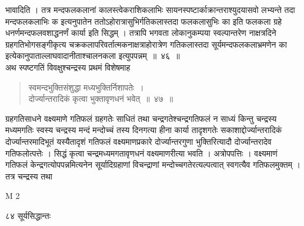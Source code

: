 \documentclass[11pt, openany]{book}
\begin{document}
\begin{sloppypar}
\noindent भावादिति । तत्र मन्दफलकलानां कालस्त्वेकराशिकलाभिः सायनस्पष्टार्काक्रान्तराश्युदयासवो लभ्यन्ते तदा मन्दफलकलाभिः क इत्यनुपातेन ततोऽहोरात्रासुभिर्गतिकलास्तदा फलकलासुभिः का इति फलकला ग्रहे धनर्णमन्दफलवशाद्धनर्णं कार्या इति सिद्धम् । तत्रापि भगवता लोकानुकम्पया स्वल्पान्तरेण नाक्षत्रदिने ग्रहगतिभोगसङ्गीकृत्य चक्रकलापरिवर्तात्मकनाक्षत्राहोरात्रेण गतिकलास्तदा सूर्यमन्दफलकलाभ्रमणेन का इत्येकानुपाताल्लाघवादानीताश्चालनकला इत्युपपन्नम्~॥~४६~॥\\
\noindent अथ स्पष्टगतिं विवक्षुश्चन्द्रस्य प्रथमं विशेषमाह\textendash
\end{sloppypar}
\begin{quote}

{\ssi स्वमन्दभुक्तिसंशुद्धा मध्यभुक्तिर्निशापतेः~।\\
दोर्ज्यान्तरादिकं कृत्वा भुक्तावृणधनं भवेत्~॥~४७~॥}
\end{quote}
\begin{sloppypar}
ग्रहगतिसाधने वक्ष्यमाणे गतिफलं ग्रहगतेः साधितं तथा चन्द्रगतेश्चन्द्रगतिफलं न साध्यं किन्तु चन्द्रस्य मध्यमगतिः स्वस्य चन्द्रस्य मन्दं मन्दोच्चं तस्य दिनगत्या हीना कार्या तादृशगतेः सकाशाद्दोर्ज्यान्तरादिकं दोर्ज्यान्तरमादिभूतं यस्यैतादृशं गतिफलं वक्ष्यमाणप्रकारे दोर्ज्यान्तरगुणा भुक्तिरित्यादौ दोर्ज्यान्तरादेव गतिफलोत्पत्तेः । सिद्धं कृत्वा चन्द्रमध्यमगतावृणधनं वक्ष्यमाणरीत्या भवति । अत्रोपपत्तिः । वक्ष्यमाणं गतिफलं केन्द्रगत्योपपन्नमित्यनेन सूर्यादिग्रहाणां विचन्द्राणां मन्दोच्चगतेरत्यल्पत्वात् स्वगत्यैव गतिफलमुक्तम् । तत्र चन्द्रस्य तथा
\end{sloppypar}

{\tiny{M 2}}

\newpage

\noindent ८४ \hspace{4cm} सूर्यसिद्धान्तः
\vspace{1cm}
\end{document}
